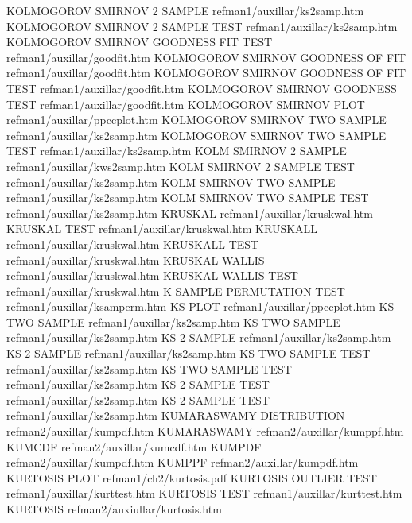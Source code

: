 KOLMOGOROV SMIRNOV 2 SAMPLE             refman1/auxillar/ks2samp.htm
KOLMOGOROV SMIRNOV 2 SAMPLE TEST        refman1/auxillar/ks2samp.htm
KOLMOGOROV SMIRNOV GOODNESS FIT TEST    refman1/auxillar/goodfit.htm
KOLMOGOROV SMIRNOV GOODNESS OF FIT      refman1/auxillar/goodfit.htm
KOLMOGOROV SMIRNOV GOODNESS OF FIT TEST refman1/auxillar/goodfit.htm
KOLMOGOROV SMIRNOV GOODNESS TEST        refman1/auxillar/goodfit.htm
KOLMOGOROV SMIRNOV PLOT                 refman1/auxillar/ppccplot.htm
KOLMOGOROV SMIRNOV TWO SAMPLE           refman1/auxillar/ks2samp.htm
KOLMOGOROV SMIRNOV TWO SAMPLE TEST      refman1/auxillar/ks2samp.htm
KOLM SMIRNOV 2 SAMPLE                   refman1/auxillar/kws2samp.htm
KOLM SMIRNOV 2 SAMPLE TEST              refman1/auxillar/ks2samp.htm
KOLM SMIRNOV TWO SAMPLE                 refman1/auxillar/ks2samp.htm
KOLM SMIRNOV TWO SAMPLE TEST            refman1/auxillar/ks2samp.htm
KRUSKAL                                 refman1/auxillar/kruskwal.htm
KRUSKAL TEST                            refman1/auxillar/kruskwal.htm
KRUSKALL                                refman1/auxillar/kruskwal.htm
KRUSKALL TEST                           refman1/auxillar/kruskwal.htm
KRUSKAL WALLIS                          refman1/auxillar/kruskwal.htm
KRUSKAL WALLIS TEST                     refman1/auxillar/kruskwal.htm
K SAMPLE PERMUTATION TEST               refman1/auxillar/ksamperm.htm
KS PLOT                                 refman1/auxillar/ppccplot.htm
KS TWO SAMPLE                           refman1/auxillar/ks2samp.htm
KS TWO SAMPLE                           refman1/auxillar/ks2samp.htm
KS 2 SAMPLE                             refman1/auxillar/ks2samp.htm
KS 2 SAMPLE                             refman1/auxillar/ks2samp.htm
KS TWO SAMPLE TEST                      refman1/auxillar/ks2samp.htm
KS TWO SAMPLE TEST                      refman1/auxillar/ks2samp.htm
KS 2 SAMPLE TEST                        refman1/auxillar/ks2samp.htm
KS 2 SAMPLE TEST                        refman1/auxillar/ks2samp.htm
KUMARASWAMY DISTRIBUTION                refman2/auxillar/kumpdf.htm
KUMARASWAMY                             refman2/auxillar/kumppf.htm
KUMCDF                                  refman2/auxillar/kumcdf.htm
KUMPDF                                  refman2/auxillar/kumpdf.htm
KUMPPF                                  refman2/auxillar/kumpdf.htm
KURTOSIS PLOT                           refman1/ch2/kurtosis.pdf
KURTOSIS OUTLIER TEST                   refman1/auxillar/kurttest.htm
KURTOSIS TEST                           refman1/auxillar/kurttest.htm
KURTOSIS                                refman2/auxiullar/kurtosis.htm
